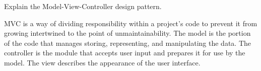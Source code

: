 Explain the Model-View-Controller design pattern. \\
\begin{answer}
MVC is a way of dividing responsibility within a project's code to prevent it from growing intertwined to the point of unmaintainability.
The model is the portion of the code that manages storing, representing, and manipulating the data.
The controller is the module that accepts user input and prepares it for use by the model.
The view describes the appearance of the user interface.
\end{answer}